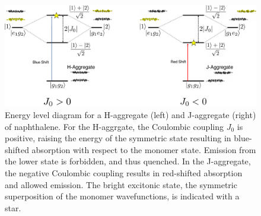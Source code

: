 \begin{figure}[H]
\centering
  \includegraphics[width=\linewidth]{1Intro/H_J_aggregates.pdf}
  \caption[Exciton energy level diagram for H- and J-aggregates]{Energy level diagram for a H-aggregate (left) and J-aggregate (right) of naphthalene. For the H-aggrgate, the Coulombic coupling $J_{0}$ is positive, raising the energy of the symmetric state resulting in blue-shifted absorption with respect to the monomer state. Emission from the lower state is forbidden, and thus quenched. In the J-aggregate, the negative Coulombic coupling results in red-shifted absorption and allowed emission. The bright excitonic state, the symmetric superposition of the monomer wavefunctions, is indicated with a star.}
  \label{figure: H_J_Aggregates}
\end{figure}

